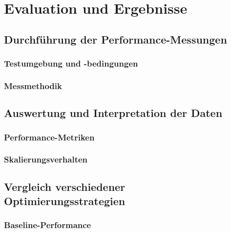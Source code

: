 \chapter{Evaluation und Ergebnisse}
\label{sec:EvaluationErgebnisse}

\section{Durchführung der Performance-Messungen}

\subsection{Testumgebung und -bedingungen}

\subsection{Messmethodik}

\section{Auswertung und Interpretation der Daten}

\subsection{Performance-Metriken}

\subsection{Skalierungsverhalten}

\section{Vergleich verschiedener Optimierungsstrategien}

\subsection{Baseline-Performance}

